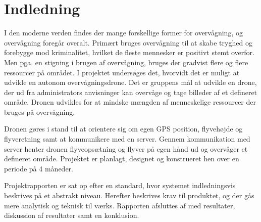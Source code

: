 \chapter{Indledning}
\label{chap:indledning}

I den moderne verden findes der mange forskellige former for overvågning, og overvågning foregår overalt. Primært bruges overvågning til at skabe tryghed og forebygge mod kriminalitet, hvilket de fleste mennesker er positivt stemt overfor. Men pga. en stigning i brugen af overvågning, bruges der gradvist flere og flere ressourcer på området. 
I projektet undersøges det, hvorvidt det er muligt at udvikle en autonom overvågningsdrone. Det er gruppens mål at udvikle en drone, der ud fra administrators anvisninger kan overvåge og tage billeder af et defineret område. Dronen udvikles for at mindske mængden af menneskelige ressourcer der bruges på overvågning.

Dronen gøres i stand til at orientere sig om egen GPS position, flyvehøjde og flyveretning samt at kommunikere med en server. Gennem kommunikation med server henter dronen flyveopsætning og flyver på egen hånd ud og overvåger et defineret område. Projektet er planlagt, designet og konstrueret hen over en periode på 4 måneder.

Projektrapporten er sat op efter en standard, hvor systemet indledningsvis beskrives på et abstrakt niveau. Herefter beskrives krav til produktet, og der gås mere analytisk og teknisk til værks. Rapporten afsluttes af med resultater, diskussion af resultater samt en konklusion.


